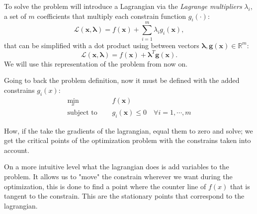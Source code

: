 \documentclass[]{article}
\theoremstyle{definition}
\begin{document}
To solve the problem will introduce a Lagrangian via the \textit{Lagrange multipliers} $\lambda_i$, a set of $m$ coefficients that multiply each constrain function $g_i(\cdot)$:
\begin{equation*}
	\mathcal{L}(\boldsymbol{x}, \boldsymbol{\lambda}) = f(\boldsymbol{x}) + \sum_{i=1}^m\lambda_i g_i(\boldsymbol{x}),
\end{equation*}
that can be simplified with a dot product using between vectors $\boldsymbol{\lambda}, \boldsymbol{g}(\boldsymbol{x}) \in \mathbb{R}^m$:
\begin{equation}\label{eq:lan_prob}
	\mathcal{L}(\boldsymbol{x}, \boldsymbol{\lambda}) = f(\boldsymbol{x}) + \boldsymbol{\lambda}^T \boldsymbol{g}(\boldsymbol{x}).
\end{equation}
We will use this representation of the problem from now on.

Going to back the problem definition, now it must be defined with the added constrains $g_i(x)$:
\begin{align}\label{eq:primal}
	\min_x \quad &f(\boldsymbol{x}) \\
	\text{subject to } \quad &g_i(\boldsymbol{x}) \leq 0 \quad \forall i = 1, \cdots, m
\end{align}

How, if the take the gradients of the lagrangian, equal them to zero and solve; we get the critical points of the optimization problem with the constrains taken into account.

On a more intuitive level what the lagrangian does is add variables to the problem. It allows us to "move" the constrain wherever we want during the optimization, this is done to find a point where the counter line of $f(x)$ that is tangent to the constrain. This are the stationary points that correspond to the lagrangian.
\end{document}
